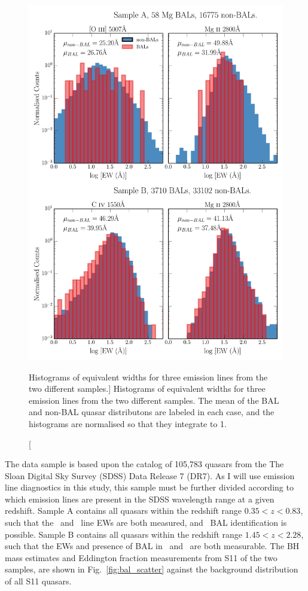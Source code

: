 \begin{figure} %
\centering
\includegraphics[width=1.0\textwidth]{figures/ewpaper/ew_hist_qsos.png}
\caption
[Histograms of equivalent widths for three emission lines from the two different samples.]
{
Histograms of equivalent widths for three emission lines from the two different samples.
The mean of the BAL and non-BAL quasar distributons are labeled in each case, and
the histograms are normalised so that they integrate to 1.
}
\label{fig:ew_hists}
\end{figure} %

The data sample is based upon the
\citet[][hereafter S11]{shen2011} catalog of
105,783 quasars from the The Sloan Digital Sky Survey (SDSS) 
Data Release 7 (DR7). 
As I will use emission line diagnostics in this study,
this sample must be further divided according to which 
emission lines are present in 
the SDSS wavelength range at a given redshift. 
Sample A contains all quasars within the redshift range $0.35<z<0.83$, 
such that the \mgline\ and \oiiifull\ line EWs are both measured, 
and \mg\ BAL identification
is possible.  Sample B contains all quasars within the redshift 
range $1.45<z<2.28$, such that 
the EWs and presence of BAL in \mgline\ and \civline\ are both measurable.
The BH mass estimates and Eddington fraction measurements from S11 of the two samples,
are shown in Fig.~\ref{fig:bal_scatter}
against the background distribution of all S11 quasars.

